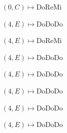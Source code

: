 \documentclass[preview]{standalone}
\begin{document}
\begin{center}
$(0,C) \mapsto$DoReMi

$(4,E) \mapsto$DoDoDo

$(4,E) \mapsto$DoReMi

$(4,E) \mapsto$DoDoDo

$(4,E) \mapsto$DoDoDo

$(4,E) \mapsto$DoDoDo

$(4,E) \mapsto$DoDoDo

$(4,E) \mapsto$DoDoDo
\end{center}
\end{document}
